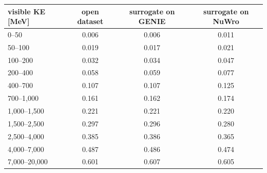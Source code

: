 \begin{tabular}{lccc}
\toprule
visible KE [MeV] & open dataset & surrogate on GENIE & surrogate on NuWro \\
\midrule
0--50 & 0.006 & 0.006 & 0.011 \\
50--100 & 0.019 & 0.017 & 0.021 \\
100--200 & 0.032 & 0.034 & 0.047 \\
200--400 & 0.058 & 0.059 & 0.077 \\
400--700 & 0.107 & 0.107 & 0.125 \\
700--1,000 & 0.161 & 0.162 & 0.174 \\
1,000--1,500 & 0.221 & 0.221 & 0.220 \\
1,500--2,500 & 0.297 & 0.296 & 0.280 \\
2,500--4,000 & 0.385 & 0.386 & 0.365 \\
4,000--7,000 & 0.487 & 0.486 & 0.474 \\
7,000--20,000 & 0.601 & 0.607 & 0.605 \\
\bottomrule
\end{tabular}
